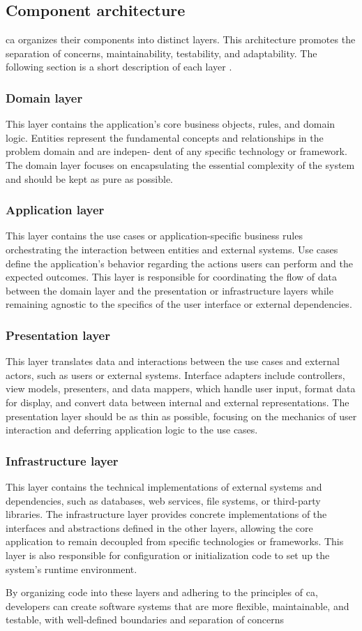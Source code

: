 \subsection{Component architecture} \label{subsec_layers}

\gls{ca} organizes their components into distinct layers. This architecture promotes the
separation of concerns, maintainability, testability, and adaptability. The following
section is a short description of each layer \parencite{robert_c_martin_clean_2018}.

\subsubsection{Domain layer}
This layer contains the application's core business objects, rules, and domain logic. Entities
represent the fundamental concepts and relationships in the problem domain and are indepen-
dent of any specific technology or framework. The domain layer focuses on encapsulating the
essential complexity of the system and should be kept as pure as possible.

\subsubsection{Application layer}
This layer contains the use cases or application-specific business rules orchestrating the
interaction between entities and external systems. Use cases define the application's
behavior regarding the actions users can perform and the expected outcomes. This layer is
responsible for coordinating the flow of data between the domain layer and the
presentation or infrastructure layers while remaining agnostic to the specifics of the
user interface or external dependencies.

\subsubsection{Presentation layer}
This layer translates data and interactions between the use cases and external actors,
such as users or external systems. Interface adapters include controllers, view models,
presenters, and data mappers, which handle user input, format data for display, and
convert data between internal and external representations. The presentation layer should
be as thin as possible, focusing on the mechanics of user interaction and deferring
application logic to the use cases.

\subsubsection{Infrastructure layer}
This layer contains the technical implementations of external systems and dependencies,
such as databases, web services, file systems, or third-party libraries. The
infrastructure layer provides concrete implementations of the interfaces and abstractions
defined in the other layers, allowing the core application to remain decoupled from
specific technologies or frameworks. This layer is also responsible for configuration or
initialization code to set up the system's runtime environment.

By organizing code into these layers and adhering to the principles of \gls{ca},
developers can create software systems that are more flexible, maintainable, and testable,
with well-defined boundaries and separation of concerns